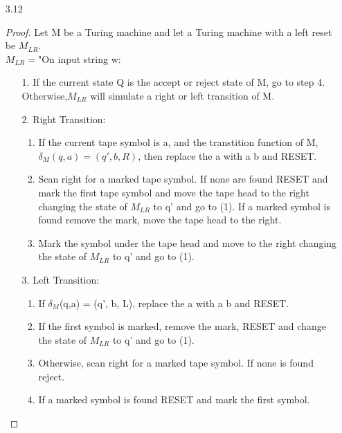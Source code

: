 \documentclass[10pt] {article}
\begin{document}
\begin{enumerate}
\begin{proof}
 Let T be a TM with doubly infinite tape. T marks the left-hand end of the input to detect and prevent the head from moving off of that end. Let D be a  2-tape TM, which was already shown to be equivalent in power to an ordinary TM,by theorem 3.13.The first tape of D is written with the input string and the second tape is blank. We cut the tape of  T into two parts, at the starting cell of the input string. The portion with the input string and all the blank spaces to its right appears on the first tape of D. The portion to the left of the input string appears on the second tape, in reverse order.
\end{proof}
\item[3.12]\begin{proof}Let M be a Turing machine and let a Turing machine with a left reset be $M_{LR}$.\\
$M_{LR}=$"On input string w:
\begin{enumerate}
\item[1.]If the current state Q is the accept or reject state of M, go to step 4. Otherwise,$M_{LR}$ will simulate a right or left transition of M.
\item[2.]Right Transition:
\begin{enumerate}
\item If the current tape symbol is a, and the transtition function of M,
$\delta_{M}(q, a) = (q', b, R)$, then replace the a with a b and RESET.
\item Scan right for a marked tape symbol. If none are found RESET and mark the
first tape symbol and move the tape head to the right changing the state of
$M_{LR}$ to q' and go to (1). If a marked symbol is found remove the mark, move the
tape head to the right.
\item Mark the symbol under the tape head and move to the right changing the state
of $M_{LR}$ to q' and go to (1).
\end{enumerate}
\item[3.] Left Transition:
\begin{enumerate}
\item If $\delta_{M}$(q,a) = (q', b, L), replace the a with a b and RESET.
\item  If the first symbol is marked, remove the mark, RESET and change the state of
$M_{LR}$ to q' and go to (1).
\item Otherwise, scan right for a marked tape symbol. If none is found reject.
\item If a marked symbol is found RESET and mark the first symbol.

\end{enumerate}
\end{enumerate}
\end{proof}
\end{enumerate}
\end{document}
